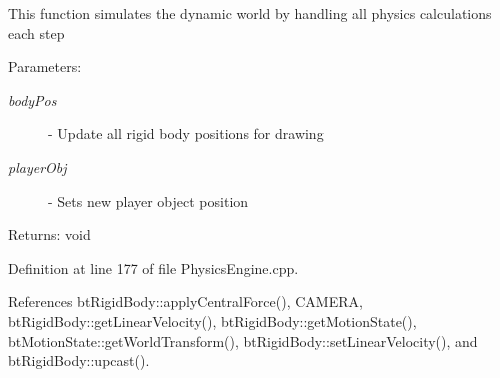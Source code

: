 This function simulates the dynamic world by handling all physics calculations each step

\begin{Desc}
\item[Parameters:]
\begin{description}
\item[{\em bodyPos}]- Update all rigid body positions for drawing \item[{\em playerObj}]- Sets new player object position\end{description}
\end{Desc}
\begin{Desc}
\item[Returns:]void \end{Desc}


Definition at line 177 of file PhysicsEngine.cpp.

References btRigidBody::applyCentralForce(), CAMERA, btRigidBody::getLinearVelocity(), btRigidBody::getMotionState(), btMotionState::getWorldTransform(), btRigidBody::setLinearVelocity(), and btRigidBody::upcast().

